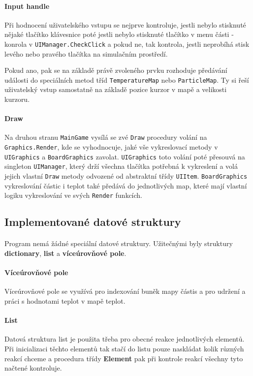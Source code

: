 \documentclass[a4paper, 12pt]{article}
\begin{document}
\paragraph{Input handle}
Při hodnocení uživatelského vstupu se nejprve kontroluje, jestli nebylo
stisknuté nějaké tlačítko klávesnice poté jestli nebylo stisknuté tlačítko v
menu části - konrola v \texttt{UIManager.CheckClick} a pokud ne, tak kontrola,
jestli neprobíhá stisk levého nebo pravého tlačítka na simulačním prostředí.

Pokud ano, pak se na základě právě zvoleného prvku rozhoduje předávání události
do speciálních metod tříd \texttt{TemperatureMap} nebo \texttt{ParticleMap}.
Ty si řeší uživatelský vstup samostatně na základě pozice kurzor v mapě a
velikosti kurzoru.

\paragraph{Draw}
Na druhou stranu \texttt{MainGame} vysílá se zvé \texttt{Draw} procedury volání
na \texttt{Graphics.Render}, kde se vyhodnocuje, jaké vše vykreslovací metody v
\texttt{UIGraphics} a \texttt{BoardGraphics} zavolat. \texttt{UIGraphics} toto
volání poté přesouvá na singleton \texttt{UIManager}, který drží všechna
tlačítka potřebná k vykreslení a volá jejich vlastní \texttt{Draw} metody
odvozené od abstraktní třídy \texttt{UIItem}.
\texttt{BoardGraphics} vykreslování částic i teplot také předává do
jednotlivých map, které mají vlastní logiku vykreslování ve svých
\texttt{Render} funkcích.

\newpage
\subsection{Implementované datové struktury}
\paragraph{}
Program nemá žádné speciální datové struktury. Užitečnými byly struktury
\textbf{dictionary}, \textbf{list} a \textbf{víceúrovňové pole}.

\paragraph{Víceúrovňové pole}
Víceúrovňové pole se využívá pro indexování buněk mapy částis a pro udržení a
práci s hodnotami teplot v mapě teplot.

\paragraph{List}
Datová struktura list je použita třeba pro obecné reakce jednotlivých elementů.
Při inicializaci těchto elementů tak stačí do listu pouze naskládat kolik
různých reakcí chceme a procedura třídy \textbf{Element} pak při kontrole
reakcí všechny tyto načtené kontroluje.
\end{document}
